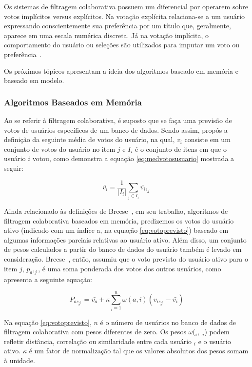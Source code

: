 Os sistemas de filtragem colaborativa possuem um diferencial por operarem sobre votos implícitos versus explícitos. Na votação explícita relaciona-se a um usuário expressando conscientemente sua preferência por um título que, geralmente, aparece em uma escala numérica discreta. Já na votação implícita, o comportamento do usuário ou seleções são utilizados para imputar um voto ou preferência~\cite{breese1998empirical}.

Os próximos tópicos apresentam a ideia dos algoritmos baseado em memória e baseado em modelo. 

\subsubsection{Algoritmos Baseados em Memória}

Ao se referir à filtragem colaborativa, é suposto que se faça uma previsão de votos de usuários específicos de um banco de dados. Sendo assim, \cite{breese1998empirical} propôs a definição da seguinte média de votos do usuário, na qual, $v_i$ consiste em um conjunto de votos do usuário no item $j$ e $I_i$ é o conjunto de itens em que o usuário $i$ votou, como demonstra a equação \ref{eq:medvotosusuario} mostrada a seguir:

\begin{equation}
    \label{eq:medvotosusuario}
    \bar{v_i} = \frac{1}{\left | I_i \right |} \sum_{_j\in I_i}^{ }\bar{v_i},_j
\end{equation}

Ainda relacionado às definições de Breese~\cite{breese1998empirical}, em seu trabalho, algoritmos de filtragem colaborativa baseados em memória, predizemos os votos do usuário ativo (indicado com um índice a, na equação \ref{eq:votoprevisto}) baseado em algumas informações parciais relativas ao usuário ativo. Além disso, um conjunto de pesos calculados a partir do banco de dados do usuário também é levado em consideração. Breese~\cite{breese1998empirical}, então, assumiu que o voto previsto do usuário ativo para o item $j$, $p_a,_j$, é uma soma ponderada dos votos dos outros usuários, como apresenta a seguinte equação:

\begin{equation}
    \label{eq:votoprevisto}
    {P_a,_j} = \bar{v_a} + \kappa \sum_{_i=1}^{n} \omega (a,i)(v_i,_j - \bar{v_i})
\end{equation}

Na equação \ref{eq:votoprevisto}, $n$ é o número de usuários no banco de dados de filtragem colaborativa com pesos diferentes de zero. Os pesos $\omega$($_i$, $_a$) podem refletir distância, correlação ou similaridade entre cada usuário $_i$ e o usuário ativo. $\kappa$ é um fator de normalização tal que os valores absolutos dos pesos somam à unidade.

